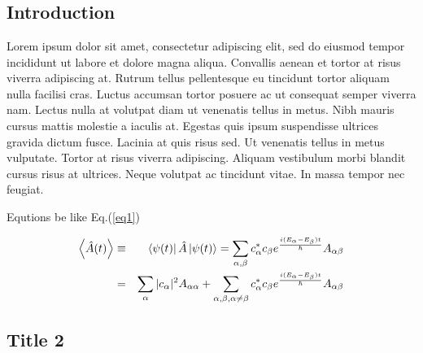 \chapter{}\label{}


\newcommand{\be}{\begin{equation}}
\newcommand{\ee}{\end{equation}}
\newcommand{\bea}{\begin{eqnarray}}
\newcommand{\eea}{\end{eqnarray}}
\newcommand{\ag}{\mbox{I \hspace{-0.82em} H}}
\newcommand{\gapp}{\mathrel{\raise.3ex\hbox{$>$}\mkern-14mu
              \lower0.6ex\hbox{$\sim$}}}
\newcommand{\lapp}{\mathrel{\raise.3ex\hbox{$<$}\mkern-14mu
              \lower0.6ex\hbox{$\sim$}}}
\newcommand{\scri}{\mathscr{I}}



\section{Introduction}

Lorem ipsum dolor sit amet, consectetur adipiscing elit, sed do eiusmod tempor incididunt ut labore et dolore magna aliqua. Convallis aenean et tortor at risus viverra adipiscing at. Rutrum tellus pellentesque eu tincidunt tortor aliquam nulla facilisi cras. Luctus accumsan tortor posuere ac ut consequat semper viverra nam. Lectus nulla at volutpat diam ut venenatis tellus in metus. Nibh mauris cursus mattis molestie a iaculis at. Egestas quis ipsum suspendisse ultrices gravida dictum fusce. Lacinia at quis risus sed. Ut venenatis tellus in metus vulputate. Tortor at risus viverra adipiscing. Aliquam vestibulum morbi blandit cursus risus at ultrices. Neque volutpat ac tincidunt vitae. In massa tempor nec feugiat.\cite{ref1}


Equtions be like Eq.(\ref{eq1})

\begin{eqnarray}
\label{eq1}
\expval{\hat{A}(t)} &\equiv& \bra{\psi(t)}\hat{A}\ket{\psi(t)}=\sum_{\alpha,\beta} c^{*}_{\alpha}c_{\beta}e^{\frac{i(E_{\alpha} - E_{\beta}) t}{\hbar}} A_{\alpha \beta} \\
&=& \sum_{\alpha} |c_{\alpha}|^2 A_{\alpha \alpha} +\sum_{\alpha,\beta,\alpha \neq \beta} c^{*}_{\alpha}c_{\beta}e^{\frac{i(E_{\alpha} - E_{\beta}) t}{\hbar}} A_{\alpha \beta}
\end{eqnarray}

\section{Title 2}

